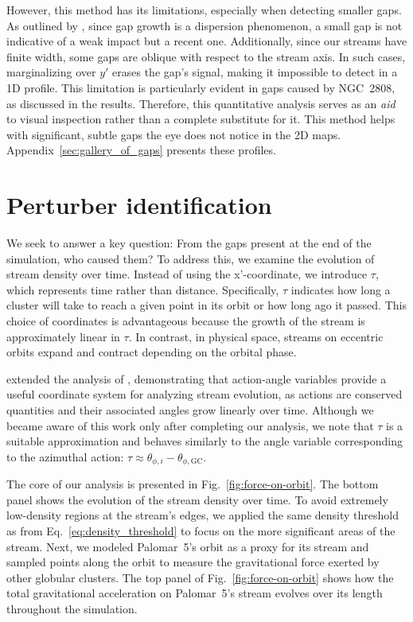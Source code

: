 \documentclass{aa}
\begin{document}
\begin{appendix}
    However, this method has its limitations, especially when detecting smaller gaps. As outlined by \citet{2015MNRAS.450.1136E}, since gap growth is a dispersion phenomenon, a small gap is not indicative of a weak impact but a recent one. Additionally, since our streams have finite width, some gaps are oblique with respect to the stream axis. In such cases, marginalizing over $y'$ erases the gap's signal, making it impossible to detect in a 1D profile. This limitation is particularly evident in gaps caused by NGC~2808, as discussed in the results. Therefore, this quantitative analysis serves as an \textit{aid} to visual inspection rather than a complete substitute for it. This method helps with significant, subtle gaps the eye does not notice in the 2D maps. Appendix~\ref{sec:gallery_of_gaps} presents these profiles.


  \section{Perturber identification} \label{sec:Perturber_Identification}

    We seek to answer a key question: From the gaps present at the end of the simulation, who caused them? To address this, we examine the evolution of stream density over time. Instead of using the x'-coordinate, we introduce $\tau$, which represents time rather than distance. Specifically, $\tau$ indicates how long a cluster will take to reach a given point in its orbit or how long ago it passed. This choice of coordinates is advantageous because the growth of the stream is approximately linear in $\tau$. In contrast, in physical space, streams on eccentric orbits expand and contract depending on the orbital phase.


    \citet{2016MNRAS.457.3817S} extended the analysis of \citet{2015MNRAS.450.1136E}, demonstrating that action-angle variables provide a useful coordinate system for analyzing stream evolution, as actions are conserved quantities and their associated angles grow linearly over time. Although we became aware of this work only after completing our analysis, we note that $\tau$ is a suitable approximation and behaves similarly to the angle variable corresponding to the azimuthal action: $\tau \approx \theta_{\phi, i} - \theta_{\phi,\text{GC}}$.

    The core of our analysis is presented in Fig.~\ref{fig:force-on-orbit}. The bottom panel shows the evolution of the stream density over time. To avoid extremely low-density regions at the stream's edges, we applied the same density threshold as from Eq.~\ref{eq:density_threshold} to focus on the more significant areas of the stream. Next, we modeled Palomar~5's orbit as a proxy for its stream and sampled points along the orbit to measure the gravitational force exerted by other globular clusters. The top panel of Fig.~\ref{fig:force-on-orbit} shows how the total gravitational acceleration on Palomar~5's stream evolves over its length throughout the simulation.


\end{appendix}
\end{document}
